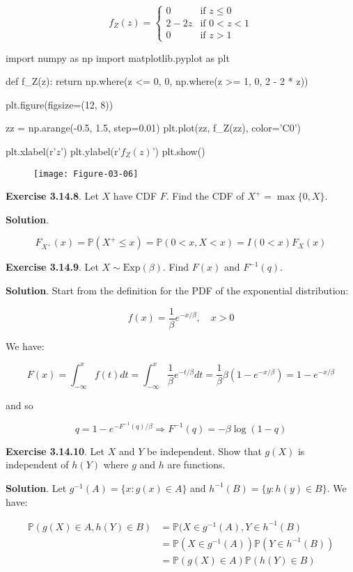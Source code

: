 \[ f_Z(z) = \begin{cases}
0 &\text{if } z \leq 0 \\
2 - 2z &\text{if } 0 < z < 1 \\
0 &\text{if } z > 1
\end{cases} \]

\begin{python}
import numpy as np
import matplotlib.pyplot as plt

def f_Z(z):
    return np.where(z <= 0, 0, np.where(z >= 1, 0, 2 - 2 * z))

plt.figure(figsize=(12, 8))

zz = np.arange(-0.5, 1.5, step=0.01)
plt.plot(zz, f_Z(zz), color='C0')
    
plt.xlabel(r'$z$')
plt.ylabel(r'$f_Z(z)$')
plt.show()
\end{python}

\begin{figure}[H]
\centering
\texttt{[image: Figure-03-06]}
\end{figure}

\textbf{Exercise 3.14.8}. Let \(X\) have CDF \(F\). Find the CDF of
\(X^+ = \max \{0, X\}\).

\textbf{Solution}.

\[ F_{X^+}(x) = \mathbb{P}(X^+ \leq x) = \mathbb{P}(0 < x, X < x) = I(0 < x) F_X(x) \]

\textbf{Exercise 3.14.9}. Let \(X \sim \text{Exp}(\beta)\). Find
\(F(x)\) and \(F^{-1}(q)\).

\textbf{Solution}. Start from the definition for the PDF of the
exponential distribution:

\[ f(x) = \frac{1}{\beta} e^{-x / \beta}, \quad x > 0 \]

We have:

\[ F(x) = \int_{-\infty}^x f(t) dt = \int_{-\infty}^x \frac{1}{\beta} e^{-t / \beta} dt = \frac{1}{\beta} \beta \left( 1 - e^{-x / \beta} \right) = 1 - e^{-x / \beta} \]

and so

\[ q = 1 - e^{-F^{-1}(q) / \beta} \Longrightarrow F^{-1}(q) = -\beta \log (1 - q) \]

\textbf{Exercise 3.14.10}. Let \(X\) and \(Y\) be independent. Show that
\(g(X)\) is independent of \(h(Y)\) where \(g\) and \(h\) are functions.

\textbf{Solution}. Let \(g^{-1}(A) = \{ x : g(x) \in A \}\) and
\(h^{-1}(B) = \{ y : h(y) \in B \}\). We have:

\begin{align*}
\mathbb{P}(g(X) \in A, h(Y) \in B) 
& = \mathbb{P}(X \in g^{-1}(A), Y \in h^{-1}(B) 
\\
& = \mathbb{P}(X \in g^{-1}(A)) \mathbb{P}(Y \in h^{-1}(B)) 
\\
& = \mathbb{P}(g(X) \in A) \mathbb{P}(h(Y) \in B)
\end{align*}

